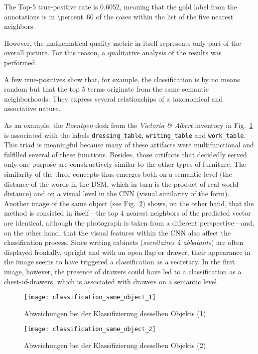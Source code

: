 The Top-5 true-positive rate is \num{0.6052}, meaning that the gold label from the annotations is in \SI{\percent}{60} of the cases within the list of the five nearest neighbors.

However, the mathematical quality metric in itself represents only part of the overall picture. For this reason, a qualitative analysis of the results was performed.

A few true-positives show that, for example, the classification is by no means random but that the top 5 terms originate from the same semantic neighborhoods. They express several relationships of a taxonomical and associative nature.

As an example, the \emph{Roentgen} desk from the \emph{Victoria \& Albert} inventory in Fig.~\ref{fig:classification_same_object_1} is associated with the labels \texttt{dressing\_table}, \texttt{writing\_table} and \texttt{work\_table}. This triad is meaningful because many of these artifacts were multifunctional and fulfilled several of these functions. Besides, those artifacts that decidedly served only one purpose are constructively similar to the other types of furniture. The similarity of the three concepts thus emerges both on a semantic level (the distance of the words in the DSM, which in turn is the product of real-world distance) and on a visual level in the CNN (visual similarity of the form). Another image of the same object (see Fig.~\ref{fig:classification_same_object_2}) shows, on the other hand, that the method is consisted in itself---the top 4 nearest neighbors of the predicted vector are identical, although the photograph is taken from a different perspective---and, on the other hand, that the visual features within the CNN also affect the classification process. Since writing cabinets (\emph{secrétaires à abbatants}) are often displayed frontally, upright and with an open flap or drawer, their appearance in the image seems to have triggered a classification as a secretary. In the first image, however, the presence of drawers could have led to a classification as a chest-of-drawers, which is associated with drawers on a semantic level.

\begin{figure}
    \centering
    \texttt{[image: classification\_same\_object\_1]}
    \caption{Abweichungen bei der Klassifizierung desselben Objekts (1)}
    \label{fig:classification_same_object_1}
\end{figure}

\begin{figure}
    \centering
    \texttt{[image: classification\_same\_object\_2]}
    \caption{Abweichungen bei der Klassifizierung desselben Objekts (2)}
    \label{fig:classification_same_object_2}
\end{figure}


